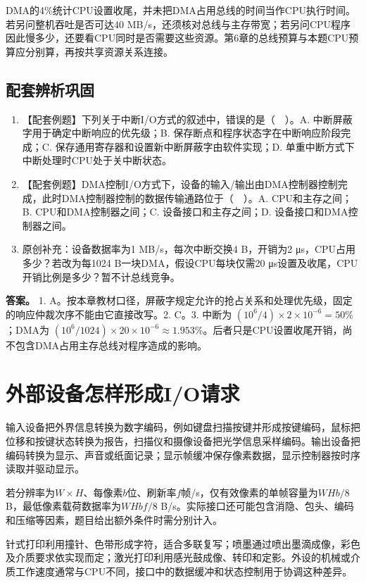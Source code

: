 DMA的4\%统计CPU设置收尾，并未把DMA占用总线的时间当作CPU执行时间。若另问整机吞吐是否可达40 MB/s，还须核对总线与主存带宽；若另问CPU程序因此慢多少，还要看CPU同时是否需要这些资源。第6章的总线预算与本题CPU预算应分别算，再按共享资源关系连接。

\subsection{配套辨析巩固}\label{CO07-old-self}

\begin{enumerate}
\def\labelenumi{\arabic{enumi}.}
\tightlist
\item
  【配套例题】下列关于中断I/O方式的叙述中，错误的是（　）。A. 中断屏蔽字用于确定中断响应的优先级；B. 保存断点和程序状态字在中断响应阶段完成；C. 保存通用寄存器和设置新中断屏蔽字由软件实现；D. 单重中断方式下中断处理时CPU处于关中断状态。
\item
  【配套例题】DMA控制I/O方式下，设备的输入/输出由DMA控制器控制完成，此时DMA控制器控制的数据传输通路位于（　）。A. CPU和主存之间；B. CPU和DMA控制器之间；C. 设备接口和主存之间；D. 设备接口和DMA控制器之间。
\item
  原创补充：设备数据率为1 MB/s，每次中断交换4 B，开销为2 μs，CPU占用多少？若改为每1024 B一块DMA，假设CPU每块仅需20 μs设置及收尾，CPU开销比例是多少？暂不计总线竞争。
\end{enumerate}

\textbf{答案。} 1. A。按本章教材口径，屏蔽字规定允许的抢占关系和处理优先级，固定的响应仲裁次序不能由它直接改写。2. C。3. 中断为 \((10^6/4)\times2\times10^{-6}=50\%\)；DMA为 \((10^6/1024)\times20\times10^{-6}\approx1.953\%\)。后者只是CPU设置收尾开销，尚不包含DMA占用主存总线对程序造成的影响。

\section{外部设备怎样形成I/O请求}\label{CO07-peripherals-complete}

输入设备把外界信息转换为数字编码，例如键盘扫描按键并形成按键编码，鼠标把位移和按键状态转换为报告，扫描仪和摄像设备把光学信息采样编码。输出设备把编码转换为显示、声音或纸面记录；显示帧缓冲保存像素数据，显示控制器按时序读取并驱动显示。

若分辨率为\(W\times H\)、每像素\(b\)位、刷新率\(f\)帧/s，仅有效像素的单帧容量为\(WHb/8\) B，最低像素载荷数据率为\(WHbf/8\) B/s。实际接口还可能包含消隐、包头、编码和压缩等因素，题目给出额外条件时需分别计入。

针式打印利用撞针、色带形成字符，适合多联复写；喷墨通过喷出墨滴成像，彩色及介质要求依实现而定；激光打印利用感光鼓成像、转印和定影。外设的机械或介质工作速度通常与CPU不同，接口中的数据缓冲和状态控制用于协调这种差异。

